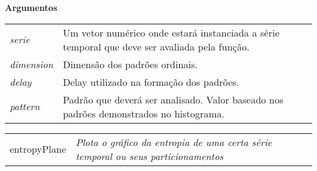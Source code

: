\textbf{Argumentos}

\begin{table}[!ht]
\begin{center}
\begin{tabularx}{\textwidth}{X X}
\hspace{0.5cm} \textit{serie} \vspace{0.5cm}& Um vetor numérico onde estará instanciada a série temporal que deve ser avaliada pela função.\vspace{0.5cm}\\
\hspace{0.5cm} \textit{dimension} \vspace{0.5cm}& Dimensão dos padrões ordinais.\vspace{0.5cm}\\
\hspace{0.5cm} \textit{delay} \vspace{0.5cm}& Delay utilizado na formação dos padrões.\vspace{0.5cm}\\
\hspace{0.5cm} \textit{pattern} \vspace{0.5cm}& Padrão que deverá ser analisado. Valor baseado nos padrões demonstrados no histograma.\vspace{0.5cm}\\
\end{tabularx}
\end{center}
\end{table} 
\newpage

\hrulefill   

\begin{table}[!ht]
\begin{center}
\begin{tabularx}{\textwidth}{ X X}
\hspace{0.5cm} entropyPlane & \textit{Plota o gráfico da entropia de uma certa série temporal ou seus particionamentos}\\
\end{tabularx}
\end{center}
\end{table} 

\vspace{-0.5cm}

\hrulefill  

\vspace{0.5cm}


